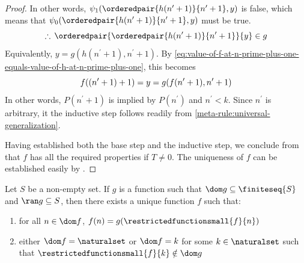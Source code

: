 \begin{proof}
    In other words, \( \psi_{1}(\orderedpair{h(n^{\prime} + 1)}{n^{\prime} + 1}, y) \)
    is false, which means that \( \psi_{0}(\orderedpair{h(n^{\prime} + 1)}{n^{\prime} + 1}, y) \)
    must be true.
    \begin{equation*}
        \therefore \, \orderedpair{ \orderedpair{h(n^{\prime} + 1)}{n^{\prime} + 1} }{y} \in g
    \end{equation*}
    Equivalently, \( y = g(h(n^{\prime} + 1), n^{\prime} + 1) \).
    By \eqref{eq:value-of-f-at-n-prime-plus-one-equals-value-of-h-at-n-prime-plus-one},
    this becomes
    \begin{equation*}
        f(\mleft( n^{\prime} + 1 \mright) + 1) = y = g(f(n^{\prime} + 1), n^{\prime} + 1)
    \end{equation*}
    In other words, \( P(n^{\prime} + 1) \) is implied by \( P(n^{\prime}) \) and \( n^{\prime} < k \).
    Since \( n^{\prime} \) is arbitrary, it the inductive step follows readily from \cref{meta-rule:universal-generalization}.

    \vspace{0.3cm}
    \noindent
    Having established both the base step and the inductive step, we conclude from  that
    \( f \) has all the required properties if \( T \neq 0 \).
    The uniqueness of \( f \) can be established easily by .
\end{proof}

\begin{recursion-theorem}
     \label{recursion-theorem:generalized-sequence-form}
    Let \( S \) be a non-empty set.
    If \( g \) is a function such that \( \dom g \subseteq \finiteseq{S} \) and \( \ran g \subseteq S \), then there exists a unique function
    \( f \) such that:
    \begin{enumerate}[topsep=2pt,label=\textup{\texttt{(\alph*)}}]
        \item for all \( n \in \dom f \), \( f(n) = g( \restrictedfunctionsmall{f}{n} ) \)
        \item either \( \dom f = \naturalset \) or \( \dom f = k \) for some \( k \in \naturalset \) such that \( \restrictedfunctionsmall{f}{k} \notin \dom g \)
    \end{enumerate}
\end{recursion-theorem}

